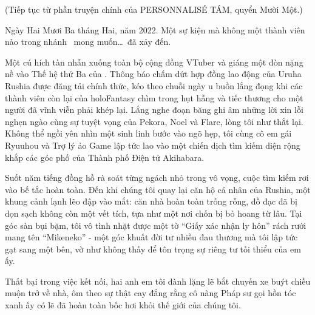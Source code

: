 ﻿\documentclass[../main.tex]{subfiles}
\begin{document}

\begin{center}
    (Tiếp tục từ phần truyện chính của {\flaregothic PERSONNALISÉ \vnmdisp TÁM}, quyển Mười Một.)
\end{center}


Ngày Hai Mươi Ba tháng Hai, năm 2022. Một sự kiện mà không một thành viên nào trong nhánh \hll\ mong muốn\dots\ đã xảy đến.

Một cú hích tàn nhẫn xuống toàn bộ cộng đồng VTuber và giáng một đòn nặng nề vào Thế hệ thứ Ba của \hll. Thông báo chấm dứt hợp đồng lao động của Uruha Rushia được đăng tải chính thức, kéo theo chuỗi ngày u buồn lắng đọng khi các thành viên còn lại của holoFantasy chìm trong hụt hẫng và tiếc thương cho một người đã vĩnh viễn phải khép lại. Lắng nghe đoạn băng ghi âm những lời xin lỗi nghẹn ngào cùng sự tuyệt vọng của Pekora, Noel và Flare, lòng tôi như thắt lại. Không thể ngồi yên nhìn một sinh linh bước vào ngõ hẹp, tôi cùng cô em gái Ryuuhou và Trợ lý ảo Game lập tức lao vào một chiến dịch tìm kiếm diện rộng khắp các góc phố của Thành phố Điện tử Akihabara.

Suốt năm tiếng đồng hồ rà soát từng ngách nhỏ trong vô vọng, cuộc tìm kiếm rơi vào bế tắc hoàn toàn. Đến khi chúng tôi quay lại căn hộ cá nhân của Rushia, một khung cảnh lạnh lẽo đập vào mắt: căn nhà hoàn toàn trống rỗng, đồ đạc đã bị dọn sạch không còn một vết tích, tựa như một nơi chốn bị bỏ hoang từ lâu. Tại góc sàn bụi bặm, tôi vô tình nhặt được một tờ ``Giấy xác nhận ly hôn'' rách rưới mang tên ``Mikeneko'' - một góc khuất đời tư nhiều đau thương mà tôi lập tức gạt sang một bên, vờ như không thấy để tôn trọng sự riêng tư tối thiểu của em ấy.

Thất bại trong việc kết nối, hai anh em tôi đành lặng lẽ bắt chuyến xe buýt chiều muộn trở về nhà, ôm theo sự thật cay đắng rằng cô nàng Pháp sư gọi hồn tóc xanh ấy có lẽ đã hoàn toàn bốc hơi khỏi thế giới của chúng tôi.
\end{document}
